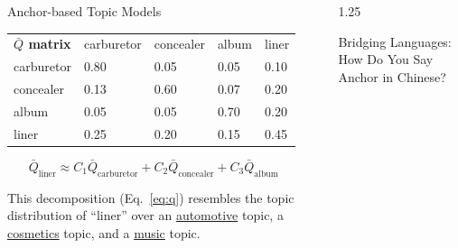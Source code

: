 \documentclass[final, 20pt]{beamer}
\newlength{\sepwidth}
\newlength{\colwidth}
\newcommand{\separatorcolumn}{\begin{column}{\sepwidth}\end{column}}
\begin{document}
\begin{frame}[t]
\begin{columns}[t]
\begin{column}{\colwidth}
\begin{block}{Anchor-based Topic Models}
    	

\begin{table}[]
	\begin{tabular}{lllll}
		\textbf{$\bar{Q}$ matrix} & carburetor                & concealer                 & album                     & liner                     \\ \cline{2-5} 
		\multicolumn{1}{l|}{carburetor} & \multicolumn{1}{l|}{0.80} & \multicolumn{1}{l|}{0.05} & \multicolumn{1}{l|}{0.05} & \multicolumn{1}{l|}{0.10} \\ \cline{2-5} 
		\multicolumn{1}{l|}{concealer}  & \multicolumn{1}{l|}{0.13} & \multicolumn{1}{l|}{0.60} & \multicolumn{1}{l|}{0.07} & \multicolumn{1}{l|}{0.20} \\ \cline{2-5} 
		\multicolumn{1}{l|}{album}      & \multicolumn{1}{l|}{0.05} & \multicolumn{1}{l|}{0.05} & \multicolumn{1}{l|}{0.70} & \multicolumn{1}{l|}{0.20} \\ \cline{2-5} 
		\multicolumn{1}{l|}{liner}      & \multicolumn{1}{l|}{0.25} & \multicolumn{1}{l|}{0.20} & \multicolumn{1}{l|}{0.15} & \multicolumn{1}{l|}{0.45} \\ \cline{2-5} 
	\end{tabular}
\end{table}

\begin{equation}
\bar{Q}_{\text{liner}} \approx C_1 \bar{Q}_{\text{carburetor}} + C_2 \bar{Q}_{\text{concealer}} + C_3 \bar{Q}_{\text{album}}
\label{eq:q}
\end{equation}


This decomposition (Eq.~\ref{eq:q}) resembles the topic distribution of ``liner'' over an \underline{automotive} topic, a \underline{cosmetics} topic, and a \underline{music} topic.
 
\end{block}

\end{column}

\separatorcolumn


\begin{column}{1.25\colwidth}

  \begin{block}{Bridging Languages: How Do You Say Anchor in Chinese?}
  	
  	\begin{columns}[t, totalwidth=\linewidth]
	

\end{columns}
\end{block}
\end{column}
\end{columns}
\end{frame}
\end{document}
